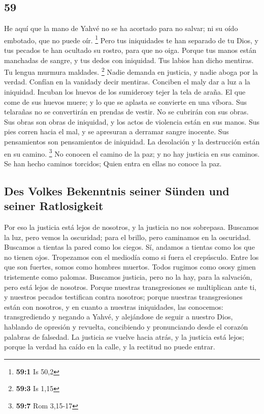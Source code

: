 \begin{paracol}{2}
\hypertarget{section-116}{%
\section{59}\label{section-116}}

 He aquí que la mano de Yahvé no se ha acortado para no
salvar; ni su oído embotado, que no puede oír. \footnote{\textbf{59:1}
  Is 50,2}  Pero tus iniquidades te han separado de tu
Dios, y tus pecados te han ocultado su rostro, para que no oiga.
 Porque tus manos están manchadas de sangre, y tus dedos
con iniquidad. Tus labios han dicho mentiras. Tu lengua murmura
maldades. \footnote{\textbf{59:3} Is 1,15}  Nadie demanda
en justicia, y nadie aboga por la verdad. Confían en la vanidady decir
mentiras. Conciben el maly dar a luz a la iniquidad. 
Incuban los huevos de los sumiderosy tejer la tela de araña. El que come
de sus huevos muere; y lo que se aplasta se convierte en una víbora.
 Sus telarañas no se convertirán en prendas de vestir. No
se cubrirán con sus obras. Sus obras son obras de iniquidad, y los actos
de violencia están en sus manos.  Sus pies corren hacia el
mal, y se apresuran a derramar sangre inocente. Sus pensamientos son
pensamientos de iniquidad. La desolación y la destrucción están en su
camino. \footnote{\textbf{59:7} Rom 3,15-17}  No conocen
el camino de la paz; y no hay justicia en sus caminos. Se han hecho
caminos torcidos; Quien entra en ellas no conoce la paz.

\hypertarget{des-volkes-bekenntnis-seiner-suxfcnden-und-seiner-ratlosigkeit}{%
\subsection{Des Volkes Bekenntnis seiner Sünden und seiner
Ratlosigkeit}\label{des-volkes-bekenntnis-seiner-suxfcnden-und-seiner-ratlosigkeit}}

 Por eso la justicia está lejos de nosotros, y la justicia
no nos sobrepasa. Buscamos la luz, pero vemos la oscuridad; para el
brillo, pero caminamos en la oscuridad.  Buscamos a
tientas la pared como los ciegos. Sí, andamos a tientas como los que no
tienen ojos. Tropezamos con el mediodía como si fuera el crepúsculo.
Entre los que son fuertes, somos como hombres muertos. 
Todos rugimos como ososy gimen tristemente como palomas. Buscamos
justicia, pero no la hay, para la salvación, pero está lejos de
nosotros.  Porque nuestras transgresiones se multiplican
ante ti, y nuestros pecados testifican contra nosotros; porque nuestras
transgresiones están con nosotros, y en cuanto a nuestras iniquidades,
las conocemos:  transgrediendo y negando a Yahvé, y
alejándose de seguir a nuestro Dios, hablando de opresión y revuelta,
concibiendo y pronunciando desde el corazón palabras de falsedad.
 La justicia se vuelve hacia atrás, y la justicia está
lejos; porque la verdad ha caído en la calle, y la rectitud no puede
entrar.


\end{paracol}
